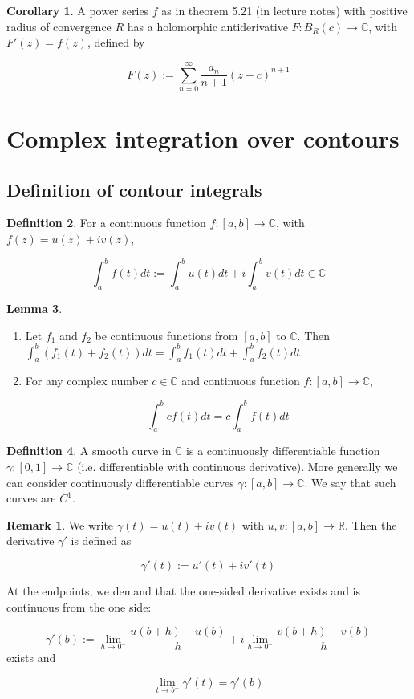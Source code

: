 \documentclass[12pt,a4paper]{article}
\theoremstyle{definition}
\newtheorem{definition}{Definition}[subsection]
\newtheorem{corollary}[definition]{Corollary}
\newtheorem{lemma}[definition]{Lemma}
\newtheorem*{remark}{Remark}
\begin{document}
\begin{corollary}
	A power series $f$ as in theorem 5.21 (in lecture notes) with positive radius of convergence $R$ has a holomorphic antiderivative $F: B_R(c) \rightarrow \mathbb{C}$, with $F'(z) = f(z)$, defined by

	\[F(z) := \sum_{n = 0}^{\infty} \frac{a_n}{n + 1} {(z - c)}^{n + 1}\]
\end{corollary}

\hfill

\section{Complex integration over contours}

\subsection{Definition of contour integrals}

\begin{definition}
	For a continuous function $f: [a, b] \rightarrow \mathbb{C}$, with $f(z) = u(z) + i v(z)$,

	\[\int_a^b f(t) dt := \int_a^b u(t) dt + i \int_a^b v(t) dt \in \mathbb{C}\]
\end{definition}

\begin{lemma}
	\hfill
	\begin{enumerate}
		\item Let $f_1$ and $f_2$ be continuous functions from $[a, b]$ to $\mathbb{C}$. Then $\int_a^b (f_1(t) + f_2(t)) dt = \int_a^b f_1(t) dt + \int_a^b f_2(t) dt$.
		\item For any complex number $c \in \mathbb{C}$ and continuous function $f: [a, b] \rightarrow \mathbb{C}$,
		
		\[ \int_a^b c f(t) dt = c \int_a^b f(t) dt \]
	\end{enumerate}
\end{lemma}

\begin{definition}
	A smooth curve in $\mathbb{C}$ is a continuously differentiable function $\gamma: [0, 1] \rightarrow \mathbb{C}$ (i.e. differentiable with continuous derivative). More generally we can consider continuously differentiable curves $\gamma: [a, b] \rightarrow \mathbb{C}$. We say that such curves are $C^1$.

\end{definition}

\begin{remark}
	We write $\gamma(t) = u(t) + i v(t)$ with $u, v: [a, b] \rightarrow \mathbb{R}$. Then the derivative $\gamma'$ is defined as

	\[ \gamma'(t) := u'(t) + i v'(t) \]

	At the endpoints, we demand that the one-sided derivative exists and is continuous from the one side:

	\[ \gamma'(b) := \lim_{h \rightarrow 0^-} \frac{u(b + h) - u(b)}{h} + i \lim_{h \rightarrow 0^-} \frac{v(b + h) - v(b)}{h} \] exists and

	\[ \lim_{t \rightarrow b^-} \gamma'(t) = \gamma'(b) \]
\end{remark}
\end{document}

